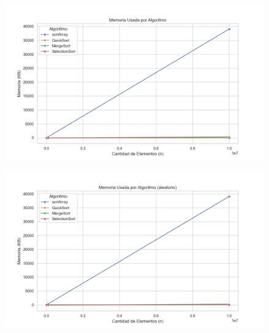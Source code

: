 \begin{figure}[H]
    \centering
    \begin{minipage}[t]{1\textwidth}
        \includegraphics[width=\textwidth]{../code/sorting/data/plots/memoria_vs_algoritmo.png}
     \end{minipage}%
    \caption{}
    \label{fig:scatterplot_3}
\end{figure}

\begin{figure}[H]
    \centering
    \begin{minipage}[t]{1\textwidth}
        \includegraphics[width=\textwidth]{../code/sorting/data/plots/memoria_vs_algoritmo_aleatorio.png}
     \end{minipage}%
    \caption{}
    \label{fig:scatterplot_3}
\end{figure}

